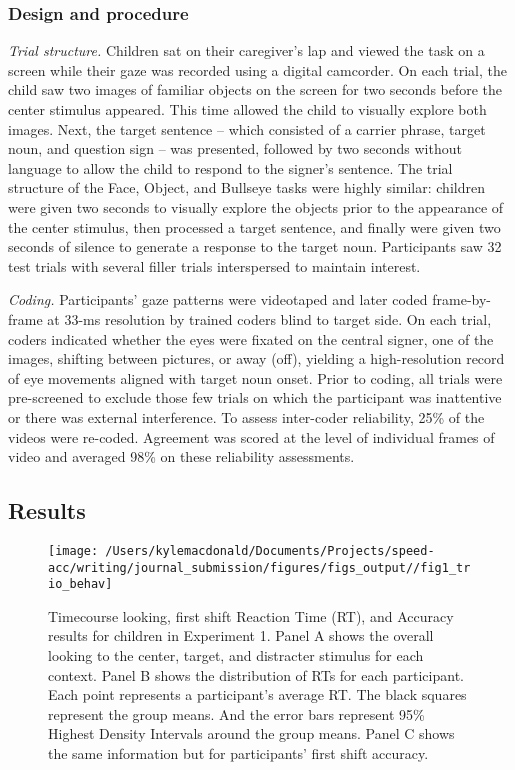 \documentclass[,man,floatsintext]{apa6}
\begin{document}
\subsubsection{Design and procedure}\label{design-and-procedure}

\emph{Trial structure.} Children sat on their caregiver's lap and viewed
the task on a screen while their gaze was recorded using a digital
camcorder. On each trial, the child saw two images of familiar objects
on the screen for two seconds before the center stimulus appeared. This
time allowed the child to visually explore both images. Next, the target
sentence -- which consisted of a carrier phrase, target noun, and
question sign -- was presented, followed by two seconds without language
to allow the child to respond to the signer's sentence. The trial
structure of the Face, Object, and Bullseye tasks were highly similar:
children were given two seconds to visually explore the objects prior to
the appearance of the center stimulus, then processed a target sentence,
and finally were given two seconds of silence to generate a response to
the target noun. Participants saw 32 test trials with several filler
trials interspersed to maintain interest.

\emph{Coding.} Participants' gaze patterns were videotaped and later
coded frame-by-frame at 33-ms resolution by trained coders blind to
target side. On each trial, coders indicated whether the eyes were
fixated on the central signer, one of the images, shifting between
pictures, or away (off), yielding a high-resolution record of eye
movements aligned with target noun onset. Prior to coding, all trials
were pre-screened to exclude those few trials on which the participant
was inattentive or there was external interference. To assess
inter-coder reliability, 25\% of the videos were re-coded. Agreement was
scored at the level of individual frames of video and averaged 98\% on
these reliability assessments.

\subsection{Results}\label{results}

\begin{figure}[!t]

{\centering \texttt{[image: /Users/kylemacdonald/Documents/Projects/speed-acc/writing/journal\_submission/figures/figs\_output//fig1\_trio\_behav]} 

}

\caption{Timecourse looking, first shift Reaction Time (RT), and Accuracy results for children in Experiment 1. Panel A shows the overall looking to the center, target, and distracter stimulus for each context. Panel B shows the distribution of RTs for each participant. Each point represents a participant's average RT. The black squares represent the group means. And the error bars represent 95\% Highest Density Intervals around the group means. Panel C shows the same information but for participants' first shift accuracy.}\label{fig:speed-acc-trio-plot}
\end{figure}
\end{document}
